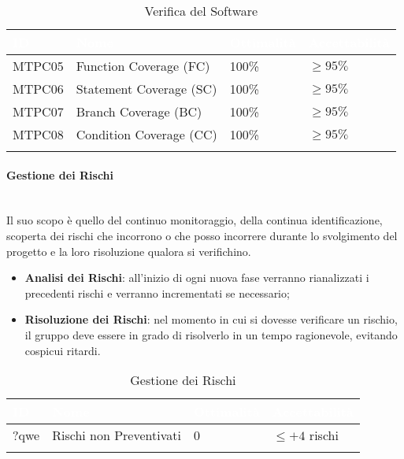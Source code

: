 \begin{longtable}{|C{.15\textwidth}|C{.24\textwidth}|C{.24\textwidth}|C{.24\textwidth}|}
\hline
{}\textbf{\textcolor{white}{ID}} & \textbf{\textcolor{white}{Nome}} & \textbf{\textcolor{white}{Ottimalità}} & \textbf{\textcolor{white}{Accettabilità}}\\
\hline \hline
\endfirsthead
MTPC05 & Function Coverage (FC) & 100\% & $\geqslant 95\%$ \\
\hline
\hline
{} MTPC06 & Statement Coverage (SC) & 100\% & $\geqslant 95\%$ \\
\hline
MTPC07 & Branch Coverage (BC) & 100\% & $\geqslant 95\%$ \\
\hline
{}MTPC08 & Condition Coverage (CC) & 100\% & $\geqslant 95\%$ \\
\hline
\caption{Verifica del Software}
\label{VerificaSoftware}
\end{longtable}

\paragraph{Gestione dei Rischi}\-\\
Il suo scopo è quello del continuo monitoraggio, della continua identificazione, scoperta dei rischi che incorrono o che posso incorrere durante lo svolgimento del progetto e la loro risoluzione qualora si verifichino. 
\begin{itemize}
	\item \textbf{Analisi dei Rischi}: all'inizio di ogni nuova fase verranno rianalizzati i precedenti rischi e verranno incrementati se necessario;
	\item \textbf{Risoluzione dei Rischi}: nel momento in cui si dovesse verificare un rischio, il gruppo deve essere in grado di risolverlo in un tempo ragionevole, evitando cospicui ritardi.
\end{itemize}

\begin{longtable}{|C{.15\textwidth}|C{.24\textwidth}|C{.24\textwidth}|C{.24\textwidth}|}
\hline
{}\textbf{\textcolor{white}{ID}} & \textbf{\textcolor{white}{Nome}} & \textbf{\textcolor{white}{Ottimalità}} & \textbf{\textcolor{white}{Accettabilità}}\\
\hline \hline
\endfirsthead
?qwe & Rischi non Preventivati & 0 & $ \leqslant +4$ rischi \\
\hline
\caption{Gestione dei Rischi}
\label{GestioneRischi}
\end{longtable}


